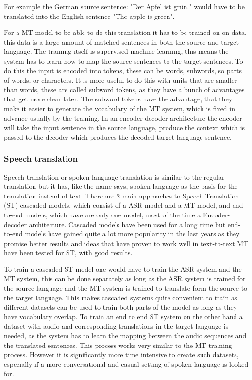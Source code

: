 For example the German source sentence: \color{blue}"Der Apfel ist grün."\color{black} would have to be translated into the English sentence \color{blue}"The apple is green"\color{black}. 

For a MT model to be able to do this translation it has to be trained on on data, this data is a large amount of matched sentences in both the source and target language. The training itself is supervised machine learning, this means the system has to learn how to map the source sentences to the target sentences. To do this the input is encoded into tokens, these can be words, subwords, so parts of words, or characters. It is more useful to do this with units that are smaller than words, these are called subword tokens, as they have a bunch of advantages that get more clear later. The subword tokens have the advantage, that they make it easier to generate the vocabulary of the MT system, which is fixed in advance usually by the training. 
In an encoder decoder architecture the encoder will take the input sentence in the source language, produce the context which is passed to the decoder which produces the decoded target language sentence. \cite[chapter~13.2]{jm3}


\subsubsection{Speech translation}
Speech translation or spoken language translation is similar to the regular translation but it has, like the name says, spoken language as the basis for the translation instead of text. 
There are 2 main approaches to Speech Translation (ST) cascaded models, which consist of a ASR model and a MT model, and end-to-end models, which have are only one model, most of the time a Encoder-decoder architecture.
Cascaded models have been used for a long time but end-to-end models have gained quite a lot more popularity in the last years as they promise better results and ideas that have proven to work well in text-to-text MT have been tested for ST, with good results.

To train a cascaded ST model one would have to train the ASR system and the MT system, this can be done separately as long as the ASR system is trained for the source language and the MT system is trained to translate form the source to the target language. This makes cascaded systems quite convenient to train as different datasets can be used to train both parts of the model as long as they have vocabulary overlap. 
To train an end to end ST system on the other hand a dataset with audio and corresponding translations in the target language is needed, as the system has to learn the mapping between the audio sequences and the translated sentences. This process works very similar to the MT training process. However it is significantly more time intensive to create such datasets, especially if a more conversational and casual setting of spoken language is looked for. 



